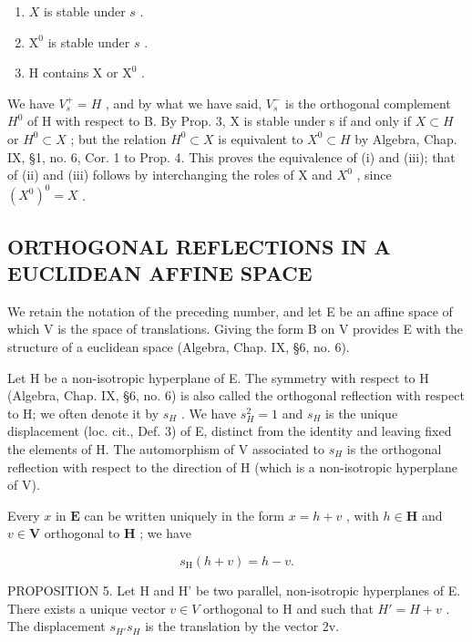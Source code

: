 \begin{enumerate}
\def\labelenumi{(\roman{enumi})}
\item
  \(X\) is stable under \(s\) .
\item
  \(\mathrm{X}^0\) is stable under \(s\) .
\item
  H contains X or \(\mathrm{X}^0\) .
\end{enumerate}

We have \(V_{s}^{+} = H\) , and by what we have said, \(V_{s}^{-}\) is the orthogonal complement \(H^{0}\) of H with respect to B. By Prop. 3, X is stable under s if and only if \(X \subset H\) or \(H^{0} \subset X\) ; but the relation \(H^{0} \subset X\) is equivalent to \(X^{0} \subset H\) by Algebra, Chap. IX, §1, no. 6, Cor. 1 to Prop. 4. This proves the equivalence of (i) and (iii); that of (ii) and (iii) follows by interchanging the roles of X and \(X^{0}\) , since \((X^{0})^{0} = X\) .

\subsection{ORTHOGONAL REFLECTIONS IN A EUCLIDEAN AFFINE SPACE}

We retain the notation of the preceding number, and let E be an affine space of which V is the space of translations. Giving the form B on V provides E with the structure of a euclidean space (Algebra, Chap. IX, §6, no. 6).

Let H be a non-isotropic hyperplane of E. The symmetry with respect to H (Algebra, Chap. IX, §6, no. 6) is also called the orthogonal reflection with respect to H; we often denote it by \(s_{H}\) . We have \(s_{H}^{2}=1\) and \(s_{H}\) is the unique displacement (loc. cit., Def. 3) of E, distinct from the identity and leaving fixed the elements of H. The automorphism of V associated to \(s_{H}\) is the orthogonal reflection with respect to the direction of H (which is a non-isotropic hyperplane of V).

Every \(x\) in \(\mathbf{E}\) can be written uniquely in the form \(x = h + v\) , with \(h \in \mathbf{H}\) and \(v \in \mathbf{V}\) orthogonal to \(\mathbf{H}\) ; we have

\[
s _ {\mathrm{H}} (h + v) = h - v.
\]

PROPOSITION 5. Let H and H' be two parallel, non-isotropic hyperplanes of E. There exists a unique vector \(v \in V\) orthogonal to H and such that \(H' = H + v\) . The displacement \(s_{H'} s_{H}\) is the translation by the vector 2v.

